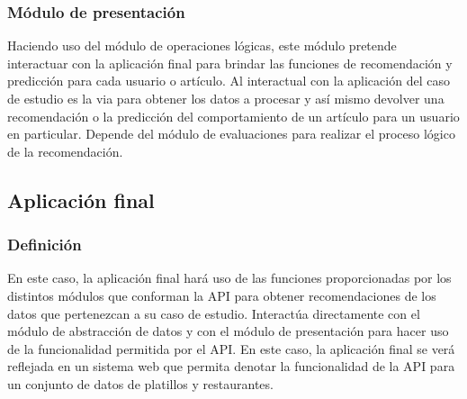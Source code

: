 \subsubsection{Módulo de presentación}
Haciendo uso del módulo de operaciones lógicas, este módulo pretende interactuar con la aplicación final para brindar las funciones de recomendación y predicción para cada usuario o artículo. Al interactual con la aplicación del caso de estudio es la via para obtener los datos a procesar y así mismo devolver una recomendación o la predicción del comportamiento de un artículo para un usuario en particular. Depende del módulo de evaluaciones para realizar el proceso lógico de la recomendación.

\subsection{Aplicación final}
\subsubsection{Definición}
En este caso, la aplicación final hará uso de las funciones proporcionadas por los distintos módulos que conforman la API para obtener recomendaciones de los datos que pertenezcan a su caso de estudio. Interactúa directamente con el módulo de abstracción de datos y con el módulo de presentación para hacer uso de la funcionalidad permitida por el API. En este caso, la aplicación final se verá reflejada en un sistema web que permita denotar la funcionalidad de la API para un conjunto de datos de platillos y restaurantes.